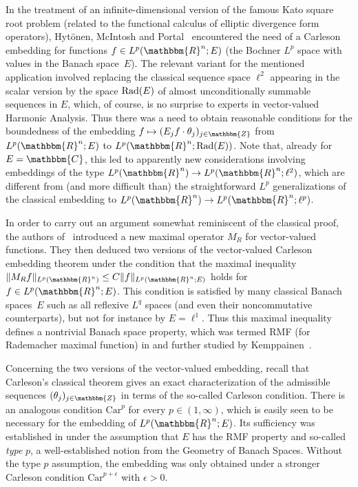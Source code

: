 \documentclass[a4paper,10pt]{amsart}
\theoremstyle{plain}
\theoremstyle{definition}
\theoremstyle{remark}
\begin{document}
In the treatment of an infinite-dimensional version of the famous Kato square root problem (related to the functional calculus of elliptic divergence form operators), Hyt\"onen, McIntosh and Portal~\cite{HMP} encountered the need of a Carleson embedding for functions  $f\in L^p({\mathbbm{R}}^n;E)$  (the Bochner $L^p$ space with values in the Banach space~$E$). The relevant variant for the mentioned application involved replacing the classical sequence space $\ell^2$ appearing in the scalar version by the space $\textup{Rad}(E)$ of almost unconditionally summable sequences in $E$, which, of course, is no surprise to experts in vector-valued Harmonic Analysis. Thus there was a need to obtain reasonable conditions for the boundedness of the embedding $f\mapsto(E_j f\cdot\theta_j)_{j\in{\mathbbm{Z}}}$ from $L^p({\mathbbm{R}}^n;E)$ to $L^p({\mathbbm{R}}^n;\textup{Rad}(E))$. Note that, already for $E={\mathbbm{C}}$, this led to apparently new considerations involving embeddings of the type $L^p({\mathbbm{R}}^n)\to L^p({\mathbbm{R}}^n;\ell^2)$, which are different from (and more difficult than) the straightforward $L^p$ generalizations of the classical embedding to $L^p({\mathbbm{R}}^n)\to L^p({\mathbbm{R}}^n;\ell^p)$.

In order to carry out an argument somewhat reminiscent of the classical proof, the authors of~\cite{HMP} introduced a new maximal operator $M_R$ for vector-valued functions. They then deduced two versions of the vector-valued Carleson embedding theorem under the condition that the maximal inequality $\|M_R f\|_{L^p({\mathbbm{R}}^n)}\leq C\|f\|_{L^p({\mathbbm{R}}^n;E)}$ holds for $f\in L^p({\mathbbm{R}}^n;E)$. This condition is satisfied by many classical Banach spaces~$E$ such as all reflexive $L^q$ spaces (and even their noncommutative counterparts), but not for instance by $E=\ell^1$.  Thus this maximal inequality defines a nontrivial Banach space property, which was termed RMF (for Rademacher maximal function) in \cite{HMP} and further studied by Kemppainen~\cite{RMF}.

Concerning the two versions of the vector-valued embedding, recall that Carleson's classical theorem gives an exact characterization of the admissible sequences $(\theta_j)_{j\in{\mathbbm{Z}}}$ in terms of the so-called Carleson condition. There is an analogous condition $\text{Car}^p$ for every $p\in(1,\infty)$, which is easily seen to be necessary for the embedding of $L^p({\mathbbm{R}}^n;E)$. Its sufficiency was established in \cite{HMP} under the assumption that $E$ has the RMF property and so-called \emph{type} $p$, a well-established notion from the Geometry of Banach Spaces. Without the type $p$ assumption, the embedding was only obtained under a stronger Carleson condition $\text{Car}^{p+\epsilon}$ with $\epsilon>0$.
\end{document}
